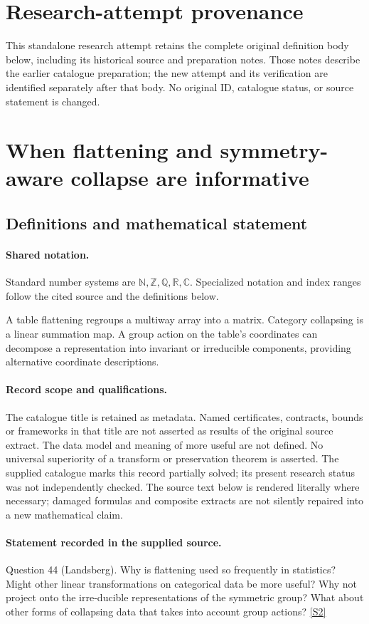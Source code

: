\documentclass[11pt]{article}
\begin{document}
\section*{Research-attempt provenance}
This standalone research attempt retains the complete original definition body below,
including its historical source and preparation notes. Those notes describe the
earlier catalogue preparation; the new attempt and its verification are identified
separately after that body. No original ID, catalogue status, or source statement is changed.

\section{When flattening and symmetry-aware collapse are informative}\label{statement}

\subsection{Definitions and mathematical statement}

\paragraph{Shared notation.}Standard number systems are $\mathbb N,\mathbb Z,\mathbb Q,\mathbb R,\mathbb C$. Specialized notation and index ranges follow the cited source and the definitions below.


A table flattening regroups a multiway array into a matrix. Category collapsing is a linear summation map. A group action on the table's coordinates can decompose a representation into invariant or irreducible components, providing alternative coordinate descriptions.
\paragraph{Record scope and qualifications.}
The catalogue title is retained as metadata. Named certificates, contracts, bounds or frameworks in that title are not asserted as results of the original source extract.
The data model and meaning of more useful are not defined. No universal superiority of a transform or preservation theorem is asserted. The supplied catalogue marks this record partially solved; its present research status was not independently checked.
The source text below is rendered literally where necessary; damaged formulas and composite extracts are not silently repaired into a new mathematical claim.
\paragraph{Statement recorded in the supplied source.}
Question 44 (Landsberg). Why is flattening used so frequently in statistics? Might other linear transformations on categorical data be more useful? Why not project onto the irre-ducible representations of the symmetric group? What about other forms of collapsing data that takes into account group actions? \href{https://aimath.org/WWN/compalgstat/compalgstat.pdf}{[S2]}
\end{document}
